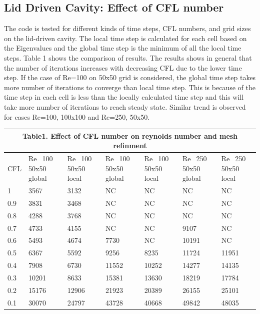 \documentclass[12pt]{elsarticle}
\begin{document}
	\subsection{Lid Driven Cavity: Effect of CFL number}
	The code is tested for different kinds of time steps, CFL numbers, and grid sizes on the lid-driven cavity. The local time step is calculated for each cell based on the Eigenvalues and the global time step is the minimum of all the local time steps. Table 1 shows the comparison of results.\newline
	\newline
	The results shows in general that the number of iterations increases with decreasing CFL due to the lower time step. If the case of Re=100 on 50x50 grid is considered, the global time step takes more number of iterations to converge than local time step. This is because of the time step in each cell is less than the locally calculated time step and this will take more number of iterations to reach steady state. Similar trend is observed for cases Re=100, 100x100 and Re=250, 50x50.\newline
	\newline
	\begin{tabular}{ |p{1.0cm}||p{1.7cm}||p{1.7cm}||p{1.7cm}||p{1.7cm}||p{1.7cm}||p{1.7cm}|  }
		\hline
		\multicolumn{7}{|c|}{Table1. Effect of CFL number on reynolds number and mesh refinment} \\
		\hline
		CFL& Re=100 50x50 global& Re=100 50x50 local& Re=100 50x50 global& Re=100 50x50 local& Re=250 50x50 global& Re=250 50x50 local\\
		\hline
		1& 3567& 3132& NC& NC& NC& NC\\
		\hline
		0.9& 3831& 3468& NC& NC& NC& NC\\
		\hline
		0.8& 4288& 3768& NC& NC& NC& NC\\
		\hline
		0.7& 4733& 4155& NC& NC& 9107& NC\\
		\hline
		0.6& 5493& 4674& 7730& NC& 10191& NC\\
		\hline
		0.5& 6367& 5592& 9256& 8235& 11724& 11951\\
		\hline
		0.4& 7908& 6730& 11552& 10252& 14277& 14135\\
		\hline
		0.3& 10201& 8633& 15381& 13630& 18219& 17784\\
		\hline
		0.2& 15176& 12906& 21923& 20389& 26155& 25101\\
		\hline
		0.1& 30070& 24797& 43728& 40668& 49842&	48035\\
		\hline
	\end{tabular}\\
	\newline
	
\end{document}
